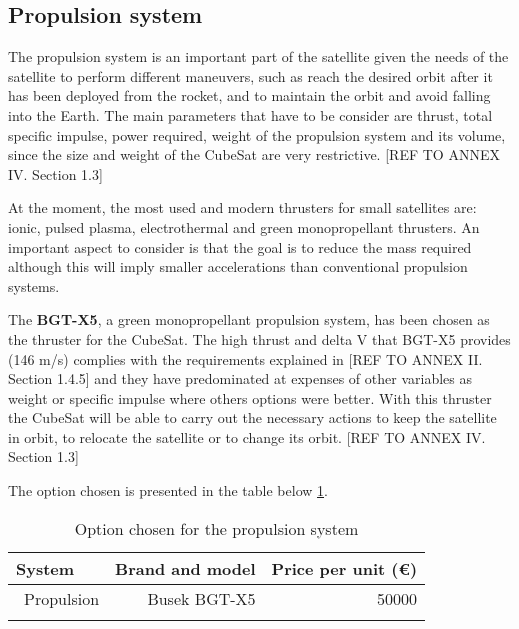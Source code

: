 \subsection{Propulsion system}
\label{ch:PropulsionSystems}
The propulsion system is an important part of the satellite given the needs of the satellite to perform different maneuvers, such as reach the desired orbit after it has been deployed from the rocket, and to maintain the orbit and avoid falling into the Earth. The main parameters that have to be consider are thrust, total specific impulse, power required, weight of the propulsion system and its volume, since the size and weight of the CubeSat are very restrictive. [{REF TO ANNEX IV. Section 1.3}]

At the moment, the most used and modern thrusters for small satellites are: ionic, pulsed plasma, electrothermal and green monopropellant thrusters. An important aspect to consider is that the goal is to reduce the mass required although this will imply smaller accelerations than conventional propulsion systems.

The \textbf{BGT-X5}, a green monopropellant propulsion system, has been chosen as the thruster for the CubeSat. The high thrust and delta V that BGT-X5 provides (146 m/s) complies with the requirements explained in [{REF TO ANNEX II. Section 1.4.5}] and they have predominated at expenses of other variables as weight or specific impulse where others options were better. With this thruster the CubeSat will be able to carry out the necessary actions to keep the satellite in orbit, to relocate the satellite or to change its orbit. [{REF TO ANNEX IV. Section 1.3}]

The option chosen is presented in the table below \ref{propulsionfinal}.

\begin{longtable}{| l | r | r | }
\hline
\rowcolor[gray]{0.80}	\textbf{System} &  \textbf{Brand and model}     & \textbf{Price per unit (\euro)}   \\
\hline
\endfirsthead

	   ~Propulsion & Busek BGT-X5 & 50000 \\
	\hline

\caption{Option chosen for the propulsion system}
\label{propulsionfinal}
\end{longtable}